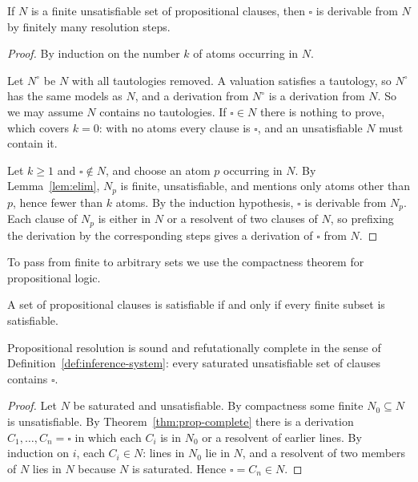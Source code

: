 \begin{theorem}
\label{thm:prop-complete}
If $N$ is a finite unsatisfiable set of propositional clauses, then $\square$ is derivable from $N$ by finitely many resolution steps.
\end{theorem}

\begin{proof}
By induction on the number $k$ of atoms occurring in $N$.

Let $N^\circ$ be $N$ with all tautologies removed. A valuation satisfies a tautology, so $N^\circ$ has the same models as $N$, and a derivation from $N^\circ$ is a derivation from $N$. So we may assume $N$ contains no tautologies. If $\square\in N$ there is nothing to prove, which covers $k=0$: with no atoms every clause is $\square$, and an unsatisfiable $N$ must contain it.

Let $k\ge1$ and $\square\notin N$, and choose an atom $p$ occurring in $N$. By Lemma~\ref{lem:elim}, $N_p$ is finite, unsatisfiable, and mentions only atoms other than $p$, hence fewer than $k$ atoms. By the induction hypothesis, $\square$ is derivable from $N_p$. Each clause of $N_p$ is either in $N$ or a resolvent of two clauses of $N$, so prefixing the derivation by the corresponding steps gives a derivation of $\square$ from $N$.
\end{proof}

To pass from finite to arbitrary sets we use the compactness theorem for propositional logic.

\begin{theorem}[Compactness]
\label{thm:compactness}
 A set of propositional clauses is satisfiable if and only if every finite subset is satisfiable.
\end{theorem}

\begin{corollary}
\label{cor:prop-refutational}
Propositional resolution is sound and refutationally complete in the sense of Definition~\ref{def:inference-system}: every saturated unsatisfiable set of clauses contains $\square$.
\end{corollary}

\begin{proof}
Let $N$ be saturated and unsatisfiable. By compactness some finite $N_0\subseteq N$ is unsatisfiable. By Theorem~\ref{thm:prop-complete} there is a derivation $C_1,\dots,C_n=\square$ in which each $C_i$ is in $N_0$ or a resolvent of earlier lines. By induction on $i$, each $C_i\in N$: lines in $N_0$ lie in $N$, and a resolvent of two members of $N$ lies in $N$ because $N$ is saturated. Hence $\square=C_n\in N$.
\end{proof}

